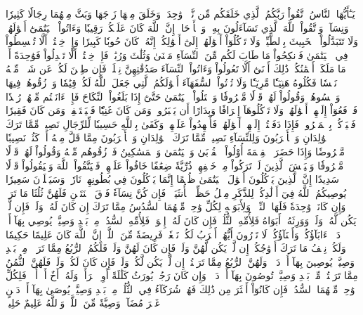 يَـٰٓأَيُّهَا ٱلنَّاسُ ٱتَّقُواْ رَبَّكُمُ ٱلَّذِي خَلَقَكُم مِّن نَّفۡسٖ وَٰحِدَةٖ وَخَلَقَ مِنۡهَا زَوۡجَهَا وَبَثَّ مِنۡهُمَا رِجَالٗا كَثِيرٗا وَنِسَآءٗۚ وَٱتَّقُواْ ٱللَّهَ ٱلَّذِي تَسَآءَلُونَ بِهِۦ وَٱلۡأَرۡحَامَۚ إِنَّ ٱللَّهَ كَانَ عَلَيۡكُمۡ رَقِيبٗا
وَءَاتُواْ ٱلۡيَتَٰمَىٰٓ أَمۡوَٰلَهُمۡۖ وَلَا تَتَبَدَّلُواْ ٱلۡخَبِيثَ بِٱلطَّيِّبِۖ وَلَا تَأۡكُلُوٓاْ أَمۡوَٰلَهُمۡ إِلَىٰٓ أَمۡوَٰلِكُمۡۚ إِنَّهُۥ كَانَ حُوبٗا كَبِيرٗا
وَإِنۡ خِفۡتُمۡ أَلَّا تُقۡسِطُواْ فِي ٱلۡيَتَٰمَىٰ فَٱنكِحُواْ مَا طَابَ لَكُم مِّنَ ٱلنِّسَآءِ مَثۡنَىٰ وَثُلَٰثَ وَرُبَٰعَۖ فَإِنۡ خِفۡتُمۡ أَلَّا تَعۡدِلُواْ فَوَٰحِدَةً أَوۡ مَا مَلَكَتۡ أَيۡمَٰنُكُمۡۚ ذَٰلِكَ أَدۡنَىٰٓ أَلَّا تَعُولُواْ
وَءَاتُواْ ٱلنِّسَآءَ صَدُقَٰتِهِنَّ نِحۡلَةٗۚ فَإِن طِبۡنَ لَكُمۡ عَن شَيۡءٖ مِّنۡهُ نَفۡسٗا فَكُلُوهُ هَنِيٓـٔٗا مَّرِيٓـٔٗا
وَلَا تُؤۡتُواْ ٱلسُّفَهَآءَ أَمۡوَٰلَكُمُ ٱلَّتِي جَعَلَ ٱللَّهُ لَكُمۡ قِيَٰمٗا وَٱرۡزُقُوهُمۡ فِيهَا وَٱكۡسُوهُمۡ وَقُولُواْ لَهُمۡ قَوۡلٗا مَّعۡرُوفٗا
وَٱبۡتَلُواْ ٱلۡيَتَٰمَىٰ حَتَّىٰٓ إِذَا بَلَغُواْ ٱلنِّكَاحَ فَإِنۡ ءَانَسۡتُم مِّنۡهُمۡ رُشۡدٗا فَٱدۡفَعُوٓاْ إِلَيۡهِمۡ أَمۡوَٰلَهُمۡۖ وَلَا تَأۡكُلُوهَآ إِسۡرَافٗا وَبِدَارًا أَن يَكۡبَرُواْۚ وَمَن كَانَ غَنِيّٗا فَلۡيَسۡتَعۡفِفۡۖ وَمَن كَانَ فَقِيرٗا فَلۡيَأۡكُلۡ بِٱلۡمَعۡرُوفِۚ فَإِذَا دَفَعۡتُمۡ إِلَيۡهِمۡ أَمۡوَٰلَهُمۡ فَأَشۡهِدُواْ عَلَيۡهِمۡۚ وَكَفَىٰ بِٱللَّهِ حَسِيبٗا
لِّلرِّجَالِ نَصِيبٞ مِّمَّا تَرَكَ ٱلۡوَٰلِدَانِ وَٱلۡأَقۡرَبُونَ وَلِلنِّسَآءِ نَصِيبٞ مِّمَّا تَرَكَ ٱلۡوَٰلِدَانِ وَٱلۡأَقۡرَبُونَ مِمَّا قَلَّ مِنۡهُ أَوۡ كَثُرَۚ نَصِيبٗا مَّفۡرُوضٗا
وَإِذَا حَضَرَ ٱلۡقِسۡمَةَ أُوْلُواْ ٱلۡقُرۡبَىٰ وَٱلۡيَتَٰمَىٰ وَٱلۡمَسَٰكِينُ فَٱرۡزُقُوهُم مِّنۡهُ وَقُولُواْ لَهُمۡ قَوۡلٗا مَّعۡرُوفٗا
وَلۡيَخۡشَ ٱلَّذِينَ لَوۡ تَرَكُواْ مِنۡ خَلۡفِهِمۡ ذُرِّيَّةٗ ضِعَٰفًا خَافُواْ عَلَيۡهِمۡ فَلۡيَتَّقُواْ ٱللَّهَ وَلۡيَقُولُواْ قَوۡلٗا سَدِيدًا
إِنَّ ٱلَّذِينَ يَأۡكُلُونَ أَمۡوَٰلَ ٱلۡيَتَٰمَىٰ ظُلۡمًا إِنَّمَا يَأۡكُلُونَ فِي بُطُونِهِمۡ نَارٗاۖ وَسَيَصۡلَوۡنَ سَعِيرٗا
يُوصِيكُمُ ٱللَّهُ فِيٓ أَوۡلَٰدِكُمۡۖ لِلذَّكَرِ مِثۡلُ حَظِّ ٱلۡأُنثَيَيۡنِۚ فَإِن كُنَّ نِسَآءٗ فَوۡقَ ٱثۡنَتَيۡنِ فَلَهُنَّ ثُلُثَا مَا تَرَكَۖ وَإِن كَانَتۡ وَٰحِدَةٗ فَلَهَا ٱلنِّصۡفُۚ وَلِأَبَوَيۡهِ لِكُلِّ وَٰحِدٖ مِّنۡهُمَا ٱلسُّدُسُ مِمَّا تَرَكَ إِن كَانَ لَهُۥ وَلَدٞۚ فَإِن لَّمۡ يَكُن لَّهُۥ وَلَدٞ وَوَرِثَهُۥٓ أَبَوَاهُ فَلِأُمِّهِ ٱلثُّلُثُۚ فَإِن كَانَ لَهُۥٓ إِخۡوَةٞ فَلِأُمِّهِ ٱلسُّدُسُۚ مِنۢ بَعۡدِ وَصِيَّةٖ يُوصِي بِهَآ أَوۡ دَيۡنٍۗ ءَابَآؤُكُمۡ وَأَبۡنَآؤُكُمۡ لَا تَدۡرُونَ أَيُّهُمۡ أَقۡرَبُ لَكُمۡ نَفۡعٗاۚ فَرِيضَةٗ مِّنَ ٱللَّهِۗ إِنَّ ٱللَّهَ كَانَ عَلِيمًا حَكِيمٗا
۞وَلَكُمۡ نِصۡفُ مَا تَرَكَ أَزۡوَٰجُكُمۡ إِن لَّمۡ يَكُن لَّهُنَّ وَلَدٞۚ فَإِن كَانَ لَهُنَّ وَلَدٞ فَلَكُمُ ٱلرُّبُعُ مِمَّا تَرَكۡنَۚ مِنۢ بَعۡدِ وَصِيَّةٖ يُوصِينَ بِهَآ أَوۡ دَيۡنٖۚ وَلَهُنَّ ٱلرُّبُعُ مِمَّا تَرَكۡتُمۡ إِن لَّمۡ يَكُن لَّكُمۡ وَلَدٞۚ فَإِن كَانَ لَكُمۡ وَلَدٞ فَلَهُنَّ ٱلثُّمُنُ مِمَّا تَرَكۡتُمۚ مِّنۢ بَعۡدِ وَصِيَّةٖ تُوصُونَ بِهَآ أَوۡ دَيۡنٖۗ وَإِن كَانَ رَجُلٞ يُورَثُ كَلَٰلَةً أَوِ ٱمۡرَأَةٞ وَلَهُۥٓ أَخٌ أَوۡ أُخۡتٞ فَلِكُلِّ وَٰحِدٖ مِّنۡهُمَا ٱلسُّدُسُۚ فَإِن كَانُوٓاْ أَكۡثَرَ مِن ذَٰلِكَ فَهُمۡ شُرَكَآءُ فِي ٱلثُّلُثِۚ مِنۢ بَعۡدِ وَصِيَّةٖ يُوصَىٰ بِهَآ أَوۡ دَيۡنٍ غَيۡرَ مُضَآرّٖۚ وَصِيَّةٗ مِّنَ ٱللَّهِۗ وَٱللَّهُ عَلِيمٌ حَلِيمٞ
